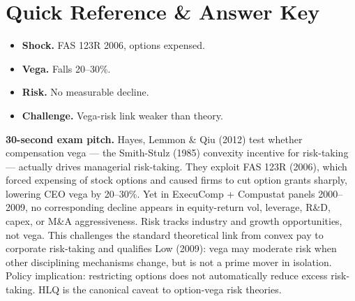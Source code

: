 \documentclass[11pt]{article}
\begin{document}
\section*{Quick Reference \& Answer Key}
\begin{answerbox}
\begin{itemize}
\item \textbf{Shock.} FAS 123R 2006, options expensed.
\item \textbf{Vega.} Falls 20--30\%.
\item \textbf{Risk.} No measurable decline.
\item \textbf{Challenge.} Vega-risk link weaker than theory.
\end{itemize}
\end{answerbox}

\begin{keybox}
\textbf{30-second exam pitch.} Hayes, Lemmon \& Qiu (2012) test whether compensation vega --- the Smith-Stulz (1985) convexity incentive for risk-taking --- actually drives managerial risk-taking. They exploit FAS 123R (2006), which forced expensing of stock options and caused firms to cut option grants sharply, lowering CEO vega by 20--30\%. Yet in ExecuComp + Compustat panels 2000--2009, no corresponding decline appears in equity-return vol, leverage, R\&D, capex, or M\&A aggressiveness. Risk tracks industry and growth opportunities, not vega. This challenges the standard theoretical link from convex pay to corporate risk-taking and qualifies Low (2009): vega may moderate risk when other disciplining mechanisms change, but is not a prime mover in isolation. Policy implication: restricting options does not automatically reduce excess risk-taking. HLQ is the canonical caveat to option-vega risk theories.
\end{keybox}
\end{document}
